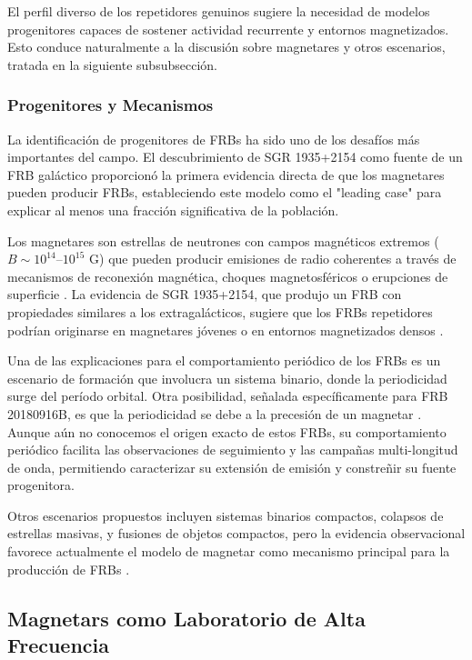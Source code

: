 El perfil diverso de los repetidores genuinos sugiere la necesidad de modelos progenitores capaces de sostener actividad recurrente y entornos magnetizados. Esto conduce naturalmente a la discusión sobre magnetares y otros escenarios, tratada en la siguiente subsubsección.

\subsubsection{Progenitores y Mecanismos}

La identificación de progenitores de FRBs ha sido uno de los desafíos más importantes del campo. El descubrimiento de SGR 1935+2154 como fuente de un FRB galáctico \citep{Bochenek2020,CHIME_SGR2020} proporcionó la primera evidencia directa de que los magnetares pueden producir FRBs, estableciendo este modelo como el "leading case" para explicar al menos una fracción significativa de la población.

Los magnetares son estrellas de neutrones con campos magnéticos extremos ($B \sim 10^{14}$--$10^{15}$ G) que pueden producir emisiones de radio coherentes a través de mecanismos de reconexión magnética, choques magnetosféricos o erupciones de superficie \citep{Bochenek2020}. La evidencia de SGR 1935+2154, que produjo un FRB con propiedades similares a los extragalácticos, sugiere que los FRBs repetidores podrían originarse en magnetares jóvenes o en entornos magnetizados densos \citep{CHIME_SGR2020}.

Una de las explicaciones para el comportamiento periódico de los FRBs es un escenario de formación que involucra un sistema binario, donde la periodicidad surge del período orbital. Otra posibilidad, señalada específicamente para FRB 20180916B, es que la periodicidad se debe a la precesión de un magnetar \citep{Feng2024}. Aunque aún no conocemos el origen exacto de estos FRBs, su comportamiento periódico facilita las observaciones de seguimiento y las campañas multi-longitud de onda, permitiendo caracterizar su extensión de emisión y constreñir su fuente progenitora.

Otros escenarios propuestos incluyen sistemas binarios compactos, colapsos de estrellas masivas, y fusiones de objetos compactos, pero la evidencia observacional favorece actualmente el modelo de magnetar como mecanismo principal para la producción de FRBs \citep{Petroff_2022}.

\subsection{Magnetars como Laboratorio de Alta Frecuencia}

